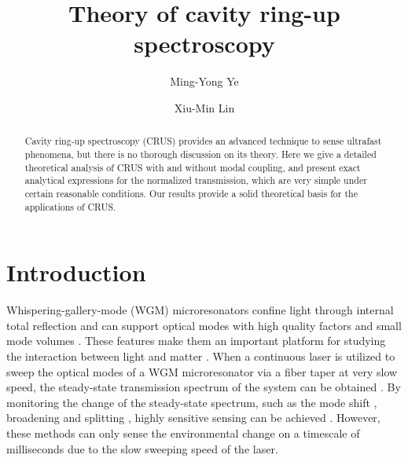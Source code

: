 \documentclass[aps,onecolumn,superscriptaddress,showpacs]{revtex4}
\begin{document}
\title{Theory of cavity ring-up spectroscopy}
\author{Ming-Yong Ye}
\author{Xiu-Min Lin }
\begin{abstract}
Cavity ring-up spectroscopy (CRUS) provides an advanced technique to sense
ultrafast phenomena, but there is no thorough discussion on its theory.
Here we give a detailed theoretical analysis of CRUS with and without modal coupling,
and present exact analytical expressions for the normalized transmission, which are very simple under certain reasonable conditions.
Our results provide a solid theoretical basis for the applications of CRUS.
\end{abstract}
\maketitle



\section{Introduction}
Whispering-gallery-mode (WGM) microresonators confine light through internal total reflection and can support optical modes with high quality  factors and small mode volumes \cite{Righini2011}. These features make them an important platform for studying the interaction between light and matter \cite{keppenberg2007,shendong2016,wang2017,wu2014,park2006}.
When a continuous laser is utilized to sweep the optical modes of a WGM microresonator via a fiber taper at very slow speed,
the steady-state transmission spectrum of the system can be obtained \cite{knight1997phase}.
By monitoring the change of the steady-state spectrum, such as the mode shift \cite{vollmer2008}, broadening \cite{shao2013} and splitting \cite{zhu2009}, highly sensitive sensing can be achieved  \cite{kimvollmer,zhi2017}.
However, these methods can only sense the environmental change on a timescale of milliseconds due to the slow sweeping speed of the laser.
\end{document}
